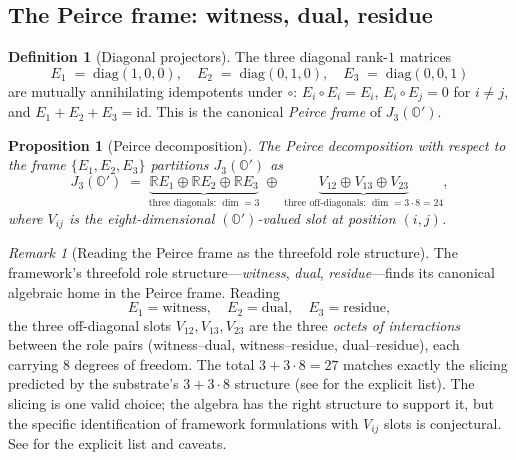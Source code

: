 \documentclass[11pt,a4paper]{article}
\theoremstyle{plain}
\newtheorem{proposition}[theorem]{Proposition}
\theoremstyle{definition}
\newtheorem{definition}[theorem]{Definition}
\theoremstyle{remark}
\newtheorem{remark}[theorem]{Remark}
\numberwithin{equation}{section}
\providecommand{\R}{\mathbb{R}}
\providecommand{\Os}{\mathbb{O}'}
\providecommand{\id}{\mathrm{id}}
\begin{document}
\subsection{The Peirce frame: witness, dual, residue}

\begin{definition}[Diagonal projectors]
\label{def:peirce-frame}
The three diagonal rank-$1$ matrices
\begin{equation}
  E_1 \;=\; \mathrm{diag}(1,0,0), \quad
  E_2 \;=\; \mathrm{diag}(0,1,0), \quad
  E_3 \;=\; \mathrm{diag}(0,0,1)
  \label{eq:peirce-projectors}
\end{equation}
are mutually annihilating idempotents under $\circ$:
$E_i \circ E_i = E_i$, $E_i \circ E_j = 0$ for $i \ne j$, and
$E_1 + E_2 + E_3 = \id$.  This is the canonical \emph{Peirce frame}
of $J_3(\Os)$.
\end{definition}

\begin{proposition}[Peirce decomposition]
\label{prop:peirce-decomposition}
The Peirce decomposition with respect to the frame
$\{E_1, E_2, E_3\}$ partitions $J_3(\Os)$ as
\begin{equation}
  J_3(\Os) \;=\; \underbrace{\R E_1 \oplus \R E_2 \oplus \R E_3}_{\text{three diagonals: } \dim = 3}
                 \;\oplus\;
                 \underbrace{V_{12} \oplus V_{13} \oplus V_{23}}_{\text{three off-diagonals: } \dim = 3\cdot 8 = 24},
  \label{eq:peirce-decomp}
\end{equation}
where $V_{ij}$ is the eight-dimensional $(\Os)$-valued slot at
position $(i,j)$.
\end{proposition}

\begin{remark}[Reading the Peirce frame as the threefold role
structure]
\label{rmk:role-reading}
The framework's threefold role structure---\emph{witness},
\emph{dual}, \emph{residue}---finds its canonical algebraic home
in the Peirce frame.  Reading
\[
  E_1 = \text{witness}, \quad
  E_2 = \text{dual}, \quad
  E_3 = \text{residue},
\]
the three off-diagonal slots $V_{12}, V_{13}, V_{23}$ are the
three \emph{octets of interactions} between the role pairs
(witness--dual, witness--residue, dual--residue), each carrying
$8$ degrees of freedom.  The total $3 + 3 \cdot 8 = 27$ matches
exactly the slicing predicted by the substrate's $3 + 3\cdot 8$
structure (see \cite[\S12]{echo-rh} for the explicit list).
The slicing is one valid choice; the algebra has the right
structure to support it, but the specific identification of
framework formulations with $V_{ij}$ slots is conjectural.  See
\cite[\S12]{echo-rh} for the explicit list and caveats.
\end{remark}
\end{document}
